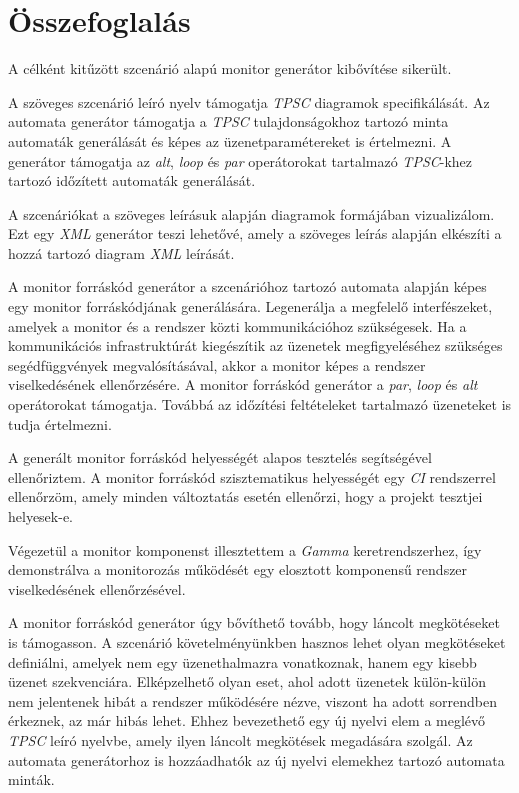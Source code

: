 \chapter{Összefoglalás}

A célként kitűzött szcenárió alapú monitor generátor kibővítése sikerült.

A szöveges szcenárió leíró nyelv támogatja \textit{TPSC} diagramok specifikálását.
Az automata generátor támogatja a \textit{TPSC} tulajdonságokhoz tartozó minta automaták generálását és képes az üzenetparamétereket is értelmezni.
A generátor támogatja az \textit{alt}, \textit{loop} és \textit{par} operátorokat tartalmazó \textit{TPSC}-khez tartozó időzített automaták generálását.

A szcenáriókat a szöveges leírásuk alapján diagramok formájában vizualizálom.
Ezt egy \textit{XML} generátor teszi lehetővé, amely a szöveges leírás alapján elkészíti a hozzá tartozó diagram \textit{XML} leírását.

A monitor forráskód generátor a szcenárióhoz tartozó automata alapján képes egy monitor forráskódjának generálására.
Legenerálja a megfelelő interfészeket, amelyek a monitor és a rendszer közti kommunikációhoz szükségesek.
Ha a kommunikációs infrastruktúrát kiegészítik az üzenetek megfigyeléséhez szükséges segédfüggvények megvalósításával, akkor a monitor képes a rendszer viselkedésének ellenőrzésére.
A monitor forráskód generátor a \textit{par}, \textit{loop} és \textit{alt} operátorokat támogatja.
Továbbá az időzítési feltételeket tartalmazó üzeneteket is tudja értelmezni.

A generált monitor forráskód helyességét alapos tesztelés segítségével ellenőriztem.
A monitor forráskód szisztematikus helyességét egy \textit{CI} rendszerrel ellenőrzöm, amely minden változtatás esetén ellenőrzi, hogy a projekt tesztjei helyesek-e.

Végezetül a monitor komponenst illesztettem a \textit{Gamma} keretrendszerhez, így demonstrálva a monitorozás működését egy elosztott komponensű rendszer viselkedésének ellenőrzésével.

A monitor forráskód generátor úgy bővíthető tovább, hogy láncolt megkötéseket is támogasson.
A szcenárió követelményünkben hasznos lehet olyan megkötéseket definiálni, amelyek nem egy üzenethalmazra vonatkoznak, hanem egy kisebb üzenet szekvenciára.
Elképzelhető olyan eset, ahol adott üzenetek külön-külön nem jelentenek hibát a rendszer működésére nézve, viszont ha adott sorrendben érkeznek, az már hibás lehet.
Ehhez bevezethető egy új nyelvi elem a meglévő \textit{TPSC} leíró nyelvbe, amely ilyen láncolt megkötések megadására szolgál.
Az automata generátorhoz is hozzáadhatók az új nyelvi elemekhez tartozó automata minták.